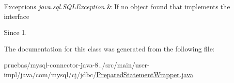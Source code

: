 \begin{DoxyExceptions}{Exceptions}
{\em java.\+sql.\+S\+Q\+L\+Exception} & If no object found that implements the interface \\
\hline
\end{DoxyExceptions}
\begin{DoxySince}{Since}
1. 
\end{DoxySince}


The documentation for this class was generated from the following file\+:\begin{DoxyCompactItemize}
\item 
pruebas/mysql-\/connector-\/java-\/8../src/main/user-\/impl/java/com/mysql/cj/jdbc/\mbox{\hyperlink{_prepared_statement_wrapper_8java}{Prepared\+Statement\+Wrapper.\+java}}\end{DoxyCompactItemize}
